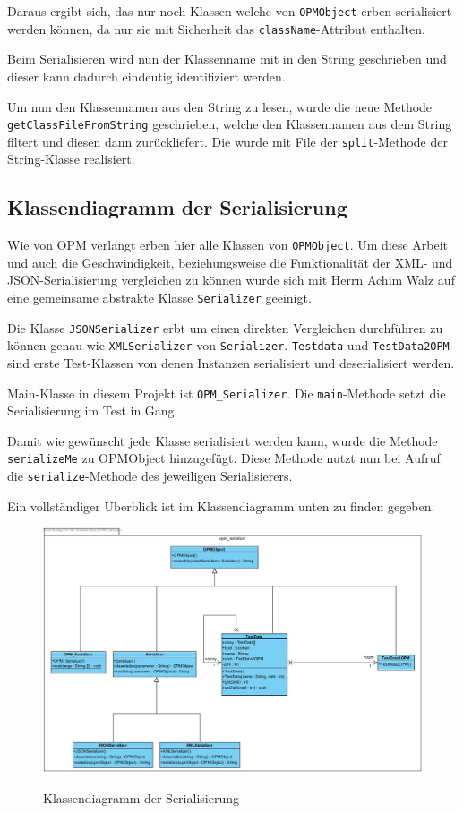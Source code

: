 Daraus ergibt sich, das nur noch Klassen welche von \texttt{OPMObject} erben serialisiert werden k\"onnen, da nur sie mit Sicherheit das \texttt{className}-Attribut enthalten.

Beim Serialisieren wird nun der Klassenname mit in den String geschrieben und dieser kann dadurch eindeutig identifiziert werden.

Um nun den Klassennamen aus den String zu lesen, wurde die neue Methode \\\texttt{getClassFileFromString} geschrieben, welche den Klassennamen aus dem String filtert und diesen dann zur\"uckliefert. Die wurde mit File der \texttt{split}-Methode der String-Klasse realisiert.

\subsection{Klassendiagramm der Serialisierung}

Wie von OPM verlangt erben hier alle Klassen von \texttt{OPMObject}. Um diese Arbeit und auch die Geschwindigkeit, beziehungsweise die Funktionalit\"at der XML- und JSON-Serialisierung vergleichen zu k\"onnen wurde sich mit Herrn Achim Walz auf eine gemeinsame abstrakte Klasse \texttt{Serializer} geeinigt. 

Die Klasse \texttt{JSONSerializer} erbt um einen direkten Vergleichen durchf\"uhren zu k\"onnen genau wie \texttt{XMLSerializer} von \texttt{Serializer}.
\texttt{Testdata} und \texttt{TestData2OPM} sind erste Test-Klassen von denen Instanzen serialisiert und deserialisiert werden.

Main-Klasse in diesem Projekt ist \texttt{OPM\_Serializer}. Die \texttt{main}-Methode setzt die Serialisierung im Test in Gang.

Damit wie gew\"unscht jede Klasse serialisiert werden kann, wurde die Methode \texttt{serializeMe} zu OPMObject hinzugef\"ugt.
Diese Methode nutzt nun bei Aufruf die \texttt{serialize}-Methode des jeweiligen Serialisierers.

Ein vollst\"andiger \"Uberblick ist im Klassendiagramm unten zu finden gegeben.

\FloatBarrier
\begin{figure}[ht]
\includegraphics[width=16cm]{Bilder/Erstes_EKD}
\label{Klassendiagramm der Serialisierung}
\caption{Klassendiagramm der Serialisierung} 
\end{figure}

